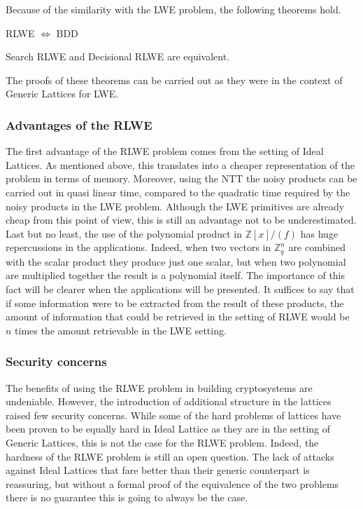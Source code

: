 Because of the similarity with the LWE problem, the following theorems hold.

\begin{theorem}
RLWE $\Leftrightarrow$ BDD
\end{theorem}
\begin{theorem}
Search RLWE and Decisional RLWE are equivalent.
\end{theorem}

The proofs of these theorems can be carried out as they were in the context of Generic Lattices for LWE.\\

\subsubsection{Advantages of the RLWE}
The first advantage of the RLWE problem comes from the setting of Ideal Lattices. As mentioned above, this translates into a cheaper representation of the problem in terms of memory. Moreover, using the NTT the noisy products can be carried out in quasi linear time, compared to the quadratic time required by the noisy products in the LWE problem. Although the LWE primitives are already cheap from this point of view, this is still an advantage not to be underestimated.\\
Last but no least, the use of the polynomial product in $\mathbb{Z}[x]/(f)$ has huge repercussions in the applications. Indeed, when two vectors in $\mathbb{Z}_q^n$ are combined with the scalar product they produce just one scalar, but when two polynomial are multiplied together the result is a polynomial itself. The importance of this fact will be clearer when the applications will be presented. It suffices to say that if some information were to be extracted from the result of these products, the amount of information that could be retrieved in the setting of RLWE would be $n$ times the amount retrievable in the LWE setting.

\subsubsection{Security concerns}
The benefits of using the RLWE problem in building cryptosystems are undeniable. However, the introduction of additional structure in the lattices raised few security concerns. While some of the hard problems of lattices have been proven to be equally hard in Ideal Lattice as they are in the setting of Generic Lattices, this is not the case for the RLWE problem. Indeed, the hardness of the RLWE problem is still an open question. The lack of attacks against Ideal Lattices that fare better than their generic counterpart is reassuring, but without a formal proof of the equivalence of the two problems there is no guarantee this is going to always be the case.
